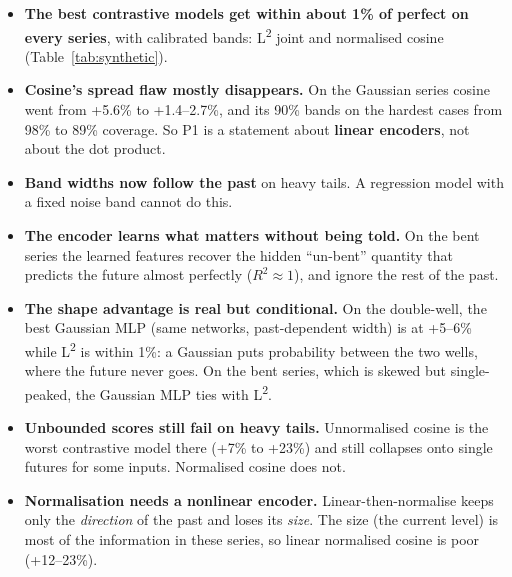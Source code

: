 \documentclass[11pt]{article}
\newcommand{\Ltwo}{L\textsuperscript{2}}
\begin{document}
\begin{itemize}
\item \textbf{The best contrastive models get within about 1\% of perfect on every series},
  with calibrated bands: \Ltwo{} joint and normalised cosine (Table~\ref{tab:synthetic}).
\item \textbf{Cosine's spread flaw mostly disappears.} On the Gaussian series cosine went
  from +5.6\% to +1.4--2.7\%, and its 90\% bands on the hardest cases from 98\% to 89\%
  coverage. So P1 is a statement about \textbf{linear encoders}, not about the dot product.
\item \textbf{Band widths now follow the past} on heavy tails. A regression model with a
  fixed noise band cannot do this.
\item \textbf{The encoder learns what matters without being told.} On the bent series the
  learned features recover the hidden ``un-bent'' quantity that predicts the future almost
  perfectly ($R^2 \approx 1$), and ignore the rest of the past.
\item \textbf{The shape advantage is real but conditional.} On the double-well, the best
  Gaussian MLP (same networks, past-dependent width) is at +5--6\% while \Ltwo{} is within
  1\%: a Gaussian puts probability between the two wells, where the future never goes. On
  the bent series, which is skewed but single-peaked, the Gaussian MLP ties with \Ltwo.
\item \textbf{Unbounded scores still fail on heavy tails.} Unnormalised cosine is the worst
  contrastive model there (+7\% to +23\%) and still collapses onto single futures for some
  inputs. Normalised cosine does not.
\item \textbf{Normalisation needs a nonlinear encoder.} Linear-then-normalise keeps only the
  \emph{direction} of the past and loses its \emph{size}. The size (the current level) is
  most of the information in these series, so linear normalised cosine is poor (+12--23\%).
\end{itemize}
\end{document}
